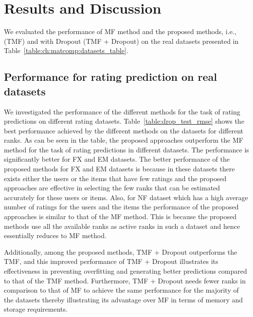 \section{Results and Discussion}\label{ch:tmf:exp_res}


We evaluated the performance of MF method and the proposed methods, i.e.,
\TMF (TMF) and \TMF with Dropout (TMF + Dropout) on the real datasets presented in Table~\ref{table:ch:matcomp:datasets_table}. 


\subsection{Performance for rating prediction on real datasets}
We investigated the performance of the different methods for the task
of rating predictions on different rating datasets. Table~\ref{table:drop_test_rmse} shows the best performance
achieved by the different methods on the datasets for different ranks. As can be seen in the table,
the proposed approaches outperform the MF method for the task of rating
predictions in different datasets. The performance is significantly better for
FX and EM datasets. 
The better performance of the proposed methods for FX and EM datasets is because
in these datasets there exists either the users or the items that have few
ratings and the proposed approaches are effective in selecting the
few ranks that can be estimated accurately for these users or
items.
Also, for NF dataset which has a high average number of ratings for the users
and the items the performance of the proposed approaches is similar to that of
the MF method. This is because the proposed methods use all the available ranks
as active ranks in such a
dataset and hence essentially reduces to MF method.


Additionally, among the proposed methods, TMF +  Dropout
outperforms the TMF, and this improved performance of TMF + Dropout illustrates
its effectiveness in preventing overfitting and generating better predictions compared to that of the TMF
method. 
Furthermore, TMF + Dropout needs fewer ranks in comparison to that of MF to
achieve the same performance for the majority of the datasets thereby
illustrating its advantage over MF in terms of memory and storage requirements.


